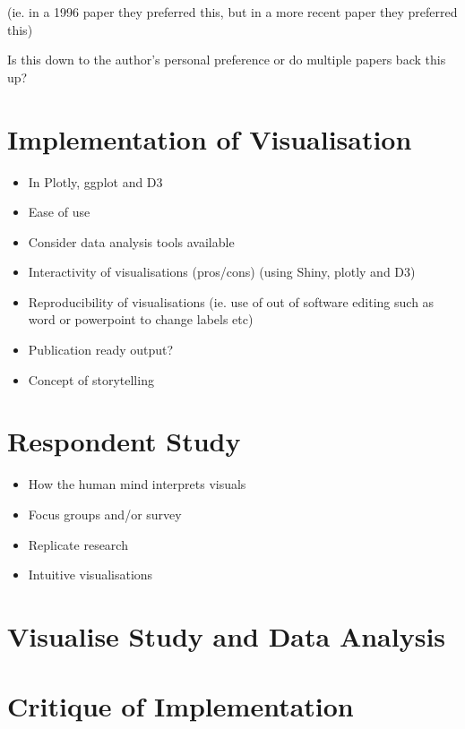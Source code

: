 \documentclass[12pt]{article}
\begin{document}
\noindent (ie. in a 1996 paper they preferred this, but in a more recent paper they preferred this)

\noindent Is this down to the author's personal preference or do multiple papers back this up?

\section{Implementation of Visualisation}
\begin{itemize}
\item In Plotly, ggplot and D3
\item Ease of use
\item Consider data analysis tools available
\item Interactivity of visualisations (pros/cons) (using Shiny, plotly and D3) 
\item Reproducibility of visualisations (ie. use of out of software editing such as word or powerpoint to change labels etc)
\item Publication ready output?
\item Concept of storytelling
\end{itemize}

\section{Respondent Study}

\begin{itemize}
\item How the human mind interprets visuals
\item Focus groups and/or survey
\item Replicate research
\item Intuitive visualisations
\end{itemize}


\section{Visualise Study and Data Analysis}

\section{Critique of Implementation}



\end{document}
